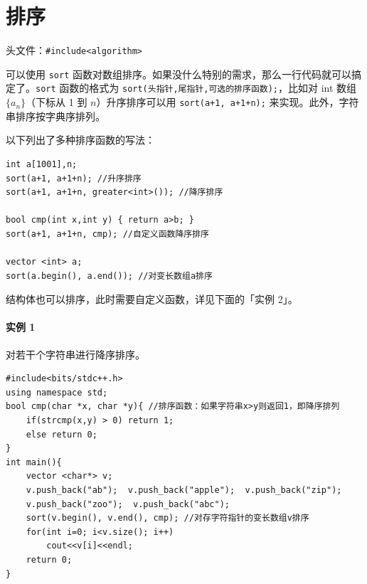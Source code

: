 \documentclass[UTF8]{ctexart}
\begin{document}
\section{排序}
头文件：\verb!#include<algorithm>!

可以使用 \verb!sort! 函数对数组排序。如果没什么特别的需求，那么一行代码就可以搞定了。\verb!sort! 函数的格式为 \verb!sort(头指针,尾指针,可选的排序函数);!，比如对 int 数组 $\{a_n\}$（下标从 1 到 $n$）升序排序可以用 \verb!sort(a+1, a+1+n);! 来实现。此外，字符串排序按字典序排列。

以下列出了多种排序函数的写法：
\begin{lstlisting}[numbers=none]
int a[1001],n;    
sort(a+1, a+1+n); //升序排序
sort(a+1, a+1+n, greater<int>()); //降序排序

bool cmp(int x,int y) { return a>b; }
sort(a+1, a+1+n, cmp); //自定义函数降序排序

vector <int> a;
sort(a.begin(), a.end()); //对变长数组a排序
\end{lstlisting}

结构体也可以排序，此时需要自定义函数，详见下面的「实例 2」。

\paragraph{实例 1} 对若干个字符串进行降序排序。
\begin{lstlisting}
#include<bits/stdc++.h>
using namespace std;
bool cmp(char *x, char *y){ //排序函数：如果字符串x>y则返回1，即降序排列
	if(strcmp(x,y) > 0) return 1;
	else return 0;
}
int main(){
	vector <char*> v;
	v.push_back("ab");  v.push_back("apple");  v.push_back("zip");
	v.push_back("zoo");  v.push_back("abc");
	sort(v.begin(), v.end(), cmp); //对存字符指针的变长数组v排序
	for(int i=0; i<v.size(); i++)
		cout<<v[i]<<endl;
	return 0;
}
\end{lstlisting}
\end{document}
